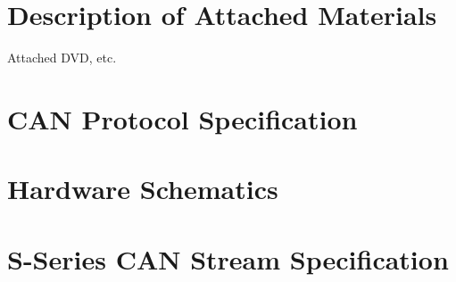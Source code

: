 \chapter{Description of Attached Materials}

Attached DVD, etc.


\chapter{CAN Protocol Specification}


\chapter{Hardware Schematics}


\chapter{S-Series CAN Stream Specification}